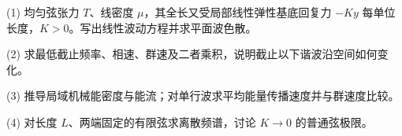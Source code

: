 (1) 均匀弦张力 \(T\)、线密度 \(\mu\)，其全长又受局部线性弹性基底回复力 \(-Ky\) 每单位长度，\(K>0\)。写出线性波动方程并求平面波色散。

(2) 求最低截止频率、相速、群速及二者乘积，说明截止以下谐波沿空间如何变化。

(3) 推导局域机械能密度与能流；对单行波求平均能量传播速度并与群速度比较。

(4) 对长度 \(L\)、两端固定的有限弦求离散频谱，讨论 \(K\to0\) 的普通弦极限。
